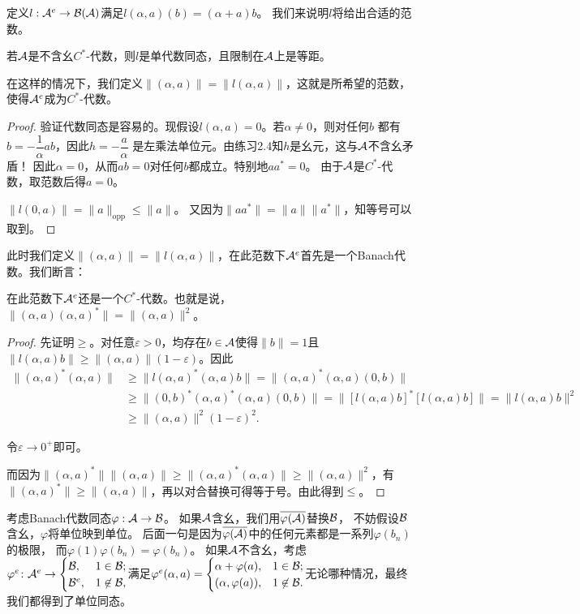 定义$l:\mathcal{A}^e \to \mathcal{B}(\mathcal{A})$满足$l(\alpha,a)(b) = (\alpha +a)b$。
我们来说明$l$将给出合适的范数。
\begin{lemma}
    若$\mathcal{A}$是不含幺$C^*$-代数，则$l$是单代数同态，且限制在$\mathcal{A}$上是等距。
\end{lemma}
\begin{remark}
    在这样的情况下，我们定义$\|(\alpha,a)\| = \|l(\alpha,a)\|$，这就是所希望的范数，
    使得$\mathcal{A}^e$成为$C^*$-代数。
\end{remark}
\begin{proof}
    验证代数同态是容易的。现假设$l(\alpha,a) = 0$。若$\alpha \neq 0$，则对任何$b$
    都有$b = -\dfrac{1}{\alpha}ab$，因此$h = -\dfrac{a}{\alpha}$
    是左乘法单位元。由\cite{Pr}练习2.4知$h$是幺元，这与$\mathcal{A}$不含幺矛盾！
    因此$\alpha = 0$，从而$ab = 0$对任何$b$都成立。特别地$aa^* = 0$。
    由于$\mathcal{A}$是$C^*$-代数，取范数后得$a = 0$。

    $\|l(0,a)\| = \|a\|_{\text{opp}} \leqslant \|a\|$。
    又因为$\|aa^*\| = \|a\|\|a^*\|$，知等号可以取到。
\end{proof}
此时我们定义$\|(\alpha,a)\| = \|l(\alpha,a)\|$，在此范数下$\mathcal{A}^e$首先是一个Banach代数。我们断言：
\begin{proposition}
    在此范数下$\mathcal{A}^e$还是一个$C^*$-代数。也就是说，$\|(\alpha,a)(\alpha,a)^*\| = \|(\alpha,a)\|^2$。
\end{proposition}
\begin{proof}
    先证明$\geqslant$。对任意$\varepsilon > 0$，均存在$b \in \mathcal{A}$使得$\|b\| = 1$且
    $\|l(\alpha,a)b\| \geqslant \|(\alpha,a)\|(1-\varepsilon)$。因此
    \begin{align*}
        \|(\alpha,a)^*(\alpha,a)\| &\geqslant \|l(\alpha,a)^*(\alpha,a)b\| 
        = \|(\alpha,a)^*(\alpha,a)(0,b)\|\\
        &\geqslant \|(0,b)^*(\alpha,a)^*(\alpha,a)(0,b)\| 
        = \|[l(\alpha,a)b]^*[l(\alpha,a)b]\| = \|l(\alpha,a)b\|^2 \\
        &\geqslant \|(\alpha,a)\|^2(1-\varepsilon)^2.
    \end{align*}

    令$\varepsilon \to 0^+$即可。

    而因为$\|(\alpha,a)^*\|\|(\alpha,a)\| \geqslant \|(\alpha,a)^*(\alpha,a)\| \geqslant \|(\alpha,a)\|^2$，有
    $\|(\alpha,a)^*\| \geqslant \|(\alpha,a)\|$，再以对合替换可得等于号。由此得到$\leqslant$。
\end{proof}

考虑Banach代数同态$\varphi:\mathcal{A} \to \mathcal{B}$。
如果$\mathcal{A}$含幺，我们用$\overline{\varphi(\mathcal{A})}$替换$\mathcal{B}$，
不妨假设$\mathcal{B}$含幺，$\varphi$将单位映到单位。
后面一句是因为$\overline{\varphi(\mathcal{A})}$中的任何元素都是一系列$\varphi(b_n)$的极限，
而$\varphi(1)\varphi(b_n) = \varphi(b_n)$。
如果$\mathcal{A}$不含幺，考虑$\varphi^e\colon \mathcal{A}^e \to \begin{cases}
    \mathcal{B}, & 1\in \mathcal{B}; \\ \mathcal{B}^e, &  1 \not\in \mathcal{B},
\end{cases}$满足$\varphi^e(\alpha,a) = \begin{cases}
    \alpha+\varphi(a), & 1 \in \mathcal{B}; \\ (\alpha,\varphi(a)), & 1 \not\in \mathcal{B}.
\end{cases}$无论哪种情况，最终我们都得到了单位同态。

